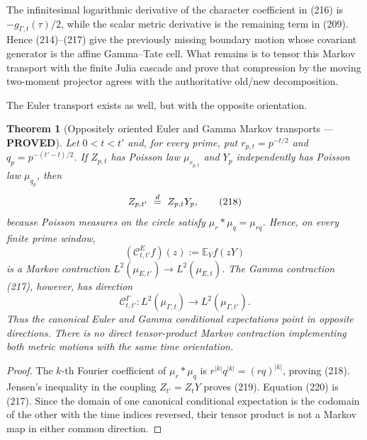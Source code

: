 \documentclass[11pt]{article}
\newtheorem{theorem}{Theorem}
\newcommand{\PROVED}{\textcolor{green!45!black}{\textbf{PROVED}}}
\begin{document}
The infinitesimal logarithmic derivative of the character coefficient in
(216) is $-g_{\Gamma,t}(\tau)/2$, while the scalar metric derivative is the
remaining term in (209).  Hence (214)--(217) give the previously missing
boundary motion whose covariant generator is the affine Gamma--Tate cell.
What remains is to tensor this Markov transport with the finite Julia cascade
and prove that compression by the moving two-moment projector agrees with the
authoritative old/new decomposition.

The Euler transport exists as well, but with the opposite orientation.

\begin{theorem}[Oppositely oriented Euler and Gamma Markov transports
--- \PROVED]
Let $0<t<t'$ and, for every prime, put
$r_{p,t}=p^{-t/2}$ and $q_p=p^{-(t'-t)/2}$.  If
$Z_{p,t}$ has Poisson law $\mu_{r_{p,t}}$ and $Y_p$ independently has
Poisson law $\mu_{q_p}$, then
\begin{equation}
 Z_{p,t'}\ \buildrel d\over=\ Z_{p,t}Y_p,             \tag{218}
\end{equation}
because Poisson measures on the circle satisfy
$\mu_r*\mu_q=\mu_{rq}$.  Hence, on every finite prime window,
\begin{equation}
 (\mathcal C^E_{t,t'}f)(z)
 :=\mathbb E_Y f(zY)                                  \tag{219}
\end{equation}
is a Markov contraction
$L^2(\mu_{E,t'})\to L^2(\mu_{E,t})$.
The Gamma contraction (217), however, has direction
\begin{equation}
 \mathcal C^\Gamma_{t,t'}:
 L^2(\mu_{\Gamma,t})\longrightarrow
 L^2(\mu_{\Gamma,t'}).                               \tag{220}
\end{equation}
Thus the canonical Euler and Gamma conditional expectations point in
opposite directions.  There is no direct tensor-product Markov contraction
implementing both metric motions with the same time orientation.
\end{theorem}

\begin{proof}
The $k$-th Fourier coefficient of $\mu_r*\mu_q$ is
$r^{|k|}q^{|k|}=(rq)^{|k|}$, proving (218).  Jensen's inequality in the
coupling $Z_{t'}=Z_tY$ proves (219).  Equation (220) is (217).  Since the
domain of one canonical conditional expectation is the codomain of the other
with the time indices reversed, their tensor product is not a Markov map in
either common direction.
\end{proof}
\end{document}

